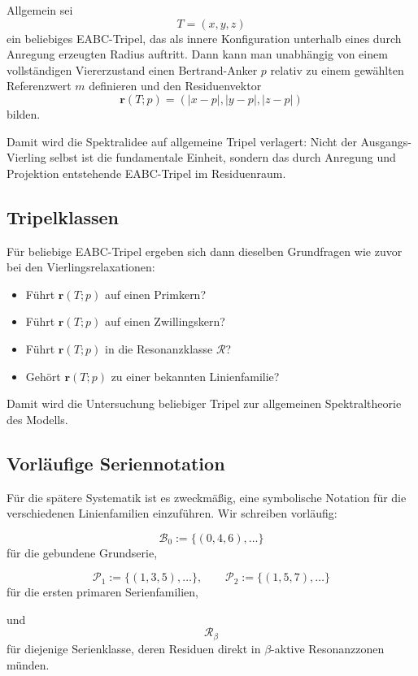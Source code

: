 \documentclass[11pt,a4paper]{article}
\theoremstyle{definition}
\theoremstyle{plain}
\theoremstyle{remark}
\begin{document}
	Allgemein sei
	\[
	T=(x,y,z)
	\]
	ein beliebiges EABC-Tripel, das als innere Konfiguration unterhalb eines durch Anregung erzeugten Radius auftritt. 
	Dann kann man unabhängig von einem vollständigen Viererzustand einen Bertrand-Anker \(p\) relativ zu einem gewählten Referenzwert \(m\) definieren und den Residuenvektor
	\[
	\mathbf r(T;p)
	=
	(|x-p|,|y-p|,|z-p|)
	\]
	bilden.
	
	Damit wird die Spektralidee auf allgemeine Tripel verlagert: 
	Nicht der Ausgangs-Vierling selbst ist die fundamentale Einheit, sondern das durch Anregung und Projektion entstehende EABC-Tripel im Residuenraum.
	
	\subsection{Tripelklassen}
	
	Für beliebige EABC-Tripel ergeben sich dann dieselben Grundfragen wie zuvor bei den Vierlingsrelaxationen:
	
	\begin{itemize}
		\item Führt \(\mathbf r(T;p)\) auf einen Primkern?
		\item Führt \(\mathbf r(T;p)\) auf einen Zwillingskern?
		\item Führt \(\mathbf r(T;p)\) in die Resonanzklasse \(\mathcal R\)?
		\item Gehört \(\mathbf r(T;p)\) zu einer bekannten Linienfamilie?
	\end{itemize}
	
	Damit wird die Untersuchung beliebiger Tripel zur allgemeinen Spektraltheorie des Modells.
	
	\subsection{Vorläufige Seriennotation}
	
	Für die spätere Systematik ist es zweckmäßig, eine symbolische Notation für die verschiedenen Linienfamilien einzuführen. 
	Wir schreiben vorläufig:
	
	\[
	\mathcal B_0 := \{(0,4,6),\dots\}
	\]
	für die gebundene Grundserie,
	
	\[
	\mathcal P_1 := \{(1,3,5),\dots\},
	\qquad
	\mathcal P_2 := \{(1,5,7),\dots\}
	\]
	für die ersten primaren Serienfamilien,
	
	und
	\[
	\mathcal R_\beta
	\]
	für diejenige Serienklasse, deren Residuen direkt in \(\beta\)-aktive Resonanzzonen münden.
	
\end{document}

